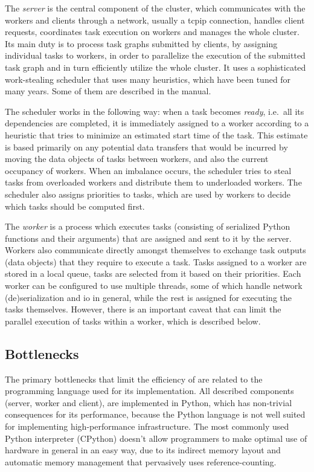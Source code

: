 The \emph{server} is the central component of the cluster, which communicates with
the workers and clients through a network, usually a \gls{tcpip} connection,
handles client requests, coordinates task execution on workers and manages the whole
\dask{} cluster. Its main duty is to process task graphs submitted by clients,
by assigning individual tasks to workers, in order to parallelize the execution of the submitted
task graph and in turn efficiently utilize the whole cluster. It uses a sophisticated work-stealing
scheduler that uses many heuristics, which have been tuned for many years. Some of them are
described in the \dask{} manual.

The scheduler works in the following way: when a task becomes \emph{ready}, i.e.\
all its dependencies are completed, it is immediately assigned to a worker according to a heuristic
that tries to minimize an estimated start time of the task. This estimate is based primarily on any
potential data transfers that would be incurred by moving the data objects of tasks between
workers, and also the current occupancy of workers. When an imbalance occurs, the scheduler tries
to steal tasks from overloaded workers and distribute them to underloaded workers. The scheduler
also assigns priorities to tasks, which are used by workers to decide which tasks should be
computed first.

The \emph{worker} is a process which executes tasks (consisting of serialized Python
functions and their arguments) that are assigned and sent to it by the server. Workers also
communicate directly amongst themselves to exchange task outputs (data objects) that they require
to execute a task. Tasks assigned to a worker are stored in a local queue, tasks are selected from
it based on their priorities. Each worker can be configured to use multiple threads, some of which
handle network (de)serialization and \gls{io} in general, while the rest is
assigned for executing the tasks themselves. However, there is an important caveat that can limit
the parallel execution of tasks within a worker, which is described below.

\subsection*{Bottlenecks}
The primary bottlenecks that limit the efficiency of \dask{} are related to the
programming language used for its implementation. All described components (server, worker and
client), are implemented in Python, which has non-trivial consequences for its performance, because
the Python language is not well suited for implementing high-performance infrastructure. The most
commonly used Python interpreter (CPython\footnoteurl{https://github.com/python/cpython}) doesn't allow programmers to
make optimal use of hardware in general in an easy way, due to its indirect memory layout and
automatic memory management that pervasively uses reference-counting.


